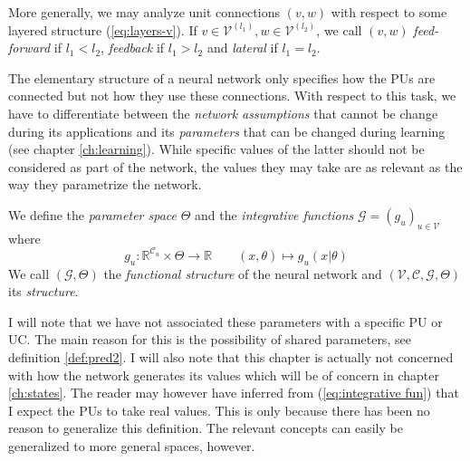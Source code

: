 \documentclass[a4paper,11pt]{article}
\begin{document}
\begin{Abs}
More generally, we may analyze unit connections $(v,w)$ with respect to some layered structure (\ref{eq:layers-v}). If $v\in\mathcal{V}^{(l_1)},w\in\mathcal{V}^{(l_2)}$, we call $(v,w)$ \emph{feed-forward} if $l_1<l_2$, \emph{feedback} if $l_1>l_2$ and \emph{lateral} if $l_1=l_2$.
\end{Abs}
\begin{Abs}
The elementary structure of a neural network only specifies how the PUs are connected but not how they use these connections. With respect to this task, we have to differentiate between the \emph{network assumptions} that cannot be change during its applications and its \emph{parameters} that can be changed during learning (see chapter \ref{ch:learning}). While specific values of the latter should not be considered as part of the network, the values they may take are as relevant as the way they parametrize the network.
\end{Abs}
\begin{Def}\label{def:integrate}
We define the \emph{parameter space} $\Theta$ and the \emph{integrative functions} $\mathcal{G}=\left(g_u\right)_{u\in\mathcal{V}}$ where 
\begin{equation}\label{eq:integrative fun}
g_u:\mathbb{R}^{\mathcal{C}_u}\times\Theta\to\mathbb{R}\qquad (x,\theta)\mapsto g_u(x|\theta)
\end{equation}
We call $(\mathcal{G},\Theta)$ the \emph{functional structure} of the neural network and $(\mathcal{V},\mathcal{C},\mathcal{G},\Theta)$ its \emph{structure}.
\end{Def}
\begin{Abs}
I will note that we have not associated these parameters with a specific PU or UC. The main reason for this is the possibility of shared parameters, see definition \ref{def:pred2}. I will also note that this chapter is actually not concerned with how the network generates its values which will be of concern in chapter \ref{ch:states}. The reader may however have inferred from (\ref{eq:integrative fun}) that I expect the PUs to take real values. This is only because there has been no reason to generalize this definition. The relevant concepts can easily be generalized to more general spaces, however.
\end{Abs}
\end{document}
